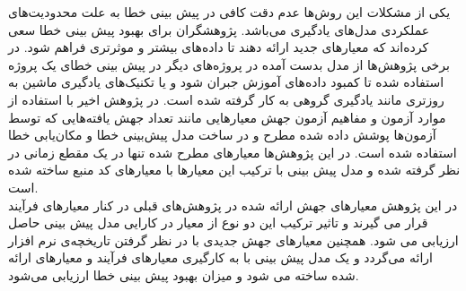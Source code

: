   یکی از مشکلات این روش‌ها عدم دقت کافی در پیش بینی خطا به علت محدودیت‌های عملکردی مدل‌های یادگیری می‌باشد. پژوهشگران برای بهبود پیش بینی خطا سعی کرده‌اند که معیارهای جدید ارائه دهند تا داده‌های بیشتر و موثرتری فراهم شود. در برخی پژوهش‌ها از مدل بدست آمده در پروژه‌های دیگر در پیش بینی خطای یک پروژه استفاده شده تا کمبود داده‌های آموزش جبران شود و یا تکنیک‌های یادگیری ماشین به روزتری مانند یادگیری گروهی به کار گرفته شده است. در پژوهش اخیر  \cite{bowes2016mutation} با استفاده از موارد آزمون و مفاهیم آزمون جهش معیارهایی مانند تعداد جهش یافته‌هایی که توسط آزمون‌ها پوشش داده شده مطرح و در ساخت مدل پیش‌بینی خطا و مکان‌یابی خطا استفاده شده است. در این پژوهش‌ها معیارهای مطرح شده تنها در یک مقطع زمانی در نظر گرفته شده و مدل پیش بینی با ترکیب این معیارها با معیارهای کد منبع ساخته شده است.\\
  
 در این پژوهش معیارهای جهش ارائه شده در پژوهش‌های قبلی در کنار معیارهای فرآیند قرار می گیرند و تاثیر ترکیب این دو نوع از معیار در کارایی مدل پیش بینی حاصل ارزیابی می شود. همچنین معیارهای جهش جدیدی با در نظر گرفتن تاریخچه‌ی نرم افزار ارائه می‌گردد و یک مدل پیش بینی با به کارگیری معیارهای فرآیند و معیارهای ارائه شده ساخته می شود و میزان بهبود پیش بینی خطا ارزیابی می‌شود.  
